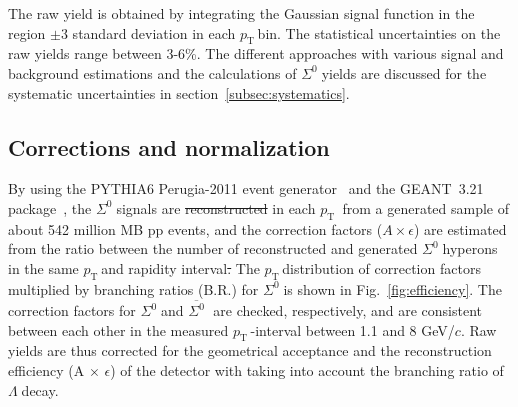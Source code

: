 \documentclass[ALICE,manyauthors]{cernphprep}
\newcommand{\sig}{\ensuremath{\Sigma^0  \; }}
\newcommand{\asig}{\ensuremath{\overline{\Sigma^0} \; }}
\newcommand{\lam}{\ensuremath{\Lambda \; }}
\newcommand{\pt}{\ensuremath{p_{\mathrm{T}\; }}}
\newcommand{\red}{\textcolor{red}}
\providecommand{\DIFaddtex}[1]{{\protect\color{blue}\uwave{#1}}} %
\providecommand{\DIFdeltex}[1]{{\protect\color{red}\sout{#1}}}                      %
\providecommand{\DIFaddbegin}{} %
\providecommand{\DIFaddend}{} %
\providecommand{\DIFdelbegin}{} %
\providecommand{\DIFdelend}{} %
\providecommand{\DIFadd}[1]{\texorpdfstring{\DIFaddtex{#1}}{#1}} %
\providecommand{\DIFdel}[1]{\texorpdfstring{\DIFdeltex{#1}}{}} %
\begin{document}
The raw yield is obtained by integrating the Gaussian signal function in the region $\pm 3$ standard deviation 
in each  \pt  bin. The statistical uncertainties on the raw yields range between 3-6\%.
The different approaches with various signal and background estimations and 
the calculations of \sig yields are discussed for the systematic uncertainties in section~\ref{subsec:systematics}.

 \subsection{Corrections and normalization}

By using the PYTHIA6 Perugia-2011 event generator~\cite{cite:pythia6}
and the GEANT~3.21 package~\cite{cite:GEANT}, the \sig signals are \DIFdelbegin \DIFdel{reconstructed }\DIFdelend \DIFaddbegin \DIFadd{counted }\DIFaddend in each \pt
from a generated sample of about 542 million MB pp events, and the correction factors ($A\times\epsilon$) are 
estimated from the ratio between the number of reconstructed and generated \sig hyperons 
in the same \pt and rapidity interval\DIFdelbegin \DIFdel{. }\DIFdelend \DIFaddbegin \DIFadd{, \red{also with taking account the vertex reconstruction efficiency.?} 
}\DIFaddend The \pt distribution of correction factors multiplied by branching 
ratios (B.R.) for \sig is shown in Fig.~\ref{fig:efficiency}. The correction factors for \sig and \asig 
are checked, respectively, and are consistent between each other in the measured \pt-interval between 
1.1 and 8 GeV/$c$. Raw yields are thus corrected for the geometrical acceptance and the reconstruction efficiency
(A $\times$ $\epsilon$) of the detector with taking into account the branching ratio of \lam decay.
\end{document}
